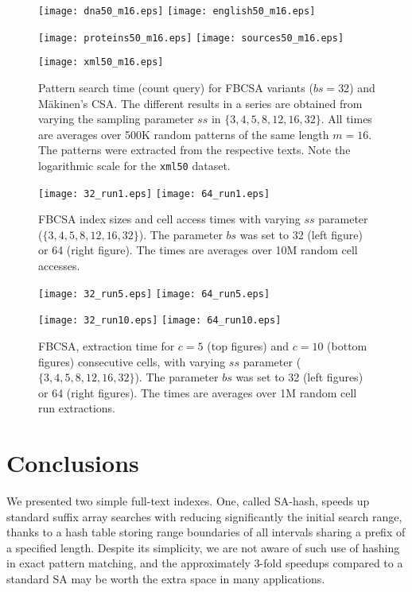 \documentclass{cai}
\begin{document}
\begin{figure}
\centerline{
\texttt{[image: dna50\_m16.eps]}
\texttt{[image: english50\_m16.eps]}
}
\centerline{
\texttt{[image: proteins50\_m16.eps]}
\texttt{[image: sources50\_m16.eps]}
}
\centerline{
\texttt{[image: xml50\_m16.eps]}
}
\caption[Results]
{Pattern search time (count query) for FBCSA variants ($bs = 32$) and 
M{\"a}kinen's CSA.
The different results in a series are obtained from varying the sampling 
parameter $ss$ in $\{3, 4, 5, 8, 12, 16, 32\}$.
All times are averages over 500K random patterns of the same length 
$m = 16$.
The patterns were extracted from the respective texts.
Note the logarithmic scale for the \texttt{xml50} dataset.}
\label{fig:fb_mak}
\end{figure}


\begin{figure}
\centerline{
\texttt{[image: 32\_run1.eps]}
\texttt{[image: 64\_run1.eps]}
}
\caption[Results]
{FBCSA index sizes and cell access times with varying $ss$ parameter 
($\{3, 4, 5, 8, 12, 16, 32\}$).
The parameter $bs$ was set to 32 (left figure) or 64 (right figure).
The times are averages over 10M random cell accesses.}
\label{fig:times2}
\end{figure}


\begin{figure}
\centerline{
\texttt{[image: 32\_run5.eps]}
\texttt{[image: 64\_run5.eps]}
}
\centerline{
\texttt{[image: 32\_run10.eps]}
\texttt{[image: 64\_run10.eps]}
}
\caption[Results]
{FBCSA, extraction time for $c = 5$ (top figures) and $c = 10$ (bottom figures) 
consecutive cells, with varying $ss$ parameter 
($\{3, 4, 5, 8, 12, 16, 32\}$).
The parameter $bs$ was set to 32 (left figures) or 64 (right figures).
The times are averages over 1M random cell run extractions.}
\label{fig:times3}
\end{figure}


\section{Conclusions}

We presented two simple full-text indexes.
One, called SA-hash, speeds up standard suffix array searches with 
reducing significantly the initial search range, thanks to a hash table 
storing range boundaries of all intervals sharing a prefix of a specified 
length.
Despite its simplicity, we are not aware of such use of hashing in 
exact pattern matching, and the approximately 3-fold speedups compared 
to a standard SA may be worth the extra space in many applications.
\end{document}
